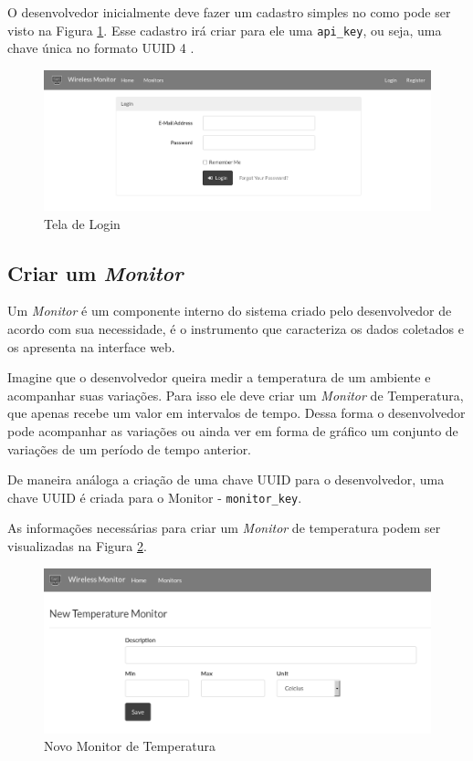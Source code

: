 O desenvolvedor inicialmente deve fazer um cadastro simples no \wm
como pode ser visto na Figura \ref{fig:login-screen}. Esse cadastro irá
criar para ele uma \texttt{api\_key}, ou seja, uma chave única no
formato UUID 4 \cite{rfc4122:2005}.

\begin{figure}[h]
    \centering
    \includegraphics[scale=0.4]{img/login-screen-grey.png}
    \caption{Tela de Login} \label{fig:login-screen}
\end{figure}

\subsection{Criar um \emph{Monitor}}\label{criar-um-monitor}

Um \emph{Monitor} é um componente interno do sistema criado pelo
desenvolvedor de acordo com sua necessidade, é o instrumento que
caracteriza os dados coletados e os apresenta na interface web.

Imagine que o desenvolvedor queira medir a temperatura de um ambiente e
acompanhar suas variações. Para isso ele deve criar um \emph{Monitor} de
Temperatura, que apenas recebe um valor em intervalos de tempo. Dessa
forma o desenvolvedor pode acompanhar as variações ou ainda ver em forma
de gráfico um conjunto de variações de um período de tempo anterior.

De maneira análoga a criação de uma chave UUID para o desenvolvedor, uma
chave UUID é criada para o Monitor - \texttt{monitor\_key}.

As informações necessárias para criar um \emph{Monitor} de temperatura
podem ser visualizadas na Figura \ref{fig:new-temperature-monitor}.

\begin{figure}[h]
    \centering
    \includegraphics[scale=0.4]{img/new-temperature-monitor-grey.png}
    \caption{Novo Monitor de Temperatura} \label{fig:new-temperature-monitor}
\end{figure}

